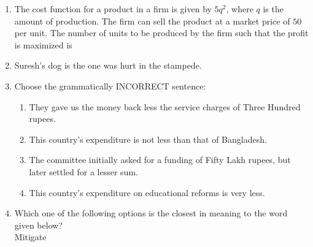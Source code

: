 \documentclass[journal]{IEEEtran}
\begin{document}
\begin{enumerate}
\item The cost function for a product in a firm is given by $5q^2$, where $q$ is the amount of production. The firm can sell the product at a market price of $50$ per unit. The number of units to be produced by the firm such that the profit is maximized is \hfill {}
\begin{enumerate}
\end{enumerate}

\item Suresh's dog is the one \underline{\hspace{1.7cm}} was hurt in the stampede. \hfill {}
\begin{enumerate}
\end{enumerate}

\item Choose the grammatically INCORRECT sentence: \hfill {}
\begin{enumerate}
\item They gave us the money back less the service charges of Three Hundred rupees.
\item This country's expenditure is not less than that of Bangladesh.
\item The committee initially asked for a funding of Fifty Lakh rupees, but later settled for a lesser sum.
\item This country's expenditure on educational reforms is very less.
\end{enumerate}

\item Which one of the following options is the closest in meaning to the word given below? \\
Mitigate \hfill {}
\begin{enumerate}
\end{enumerate}


\end{enumerate}
\end{document}
